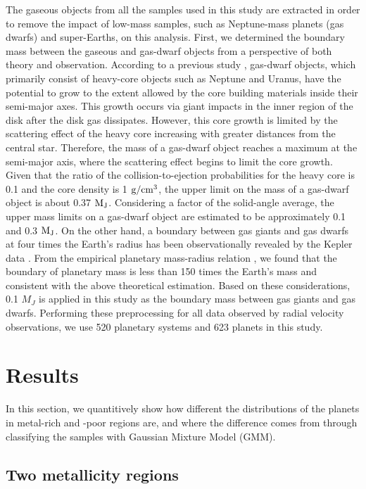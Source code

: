 \documentclass[twocolumn, dvipdfmx]{aastex62}
\begin{document}
\begin{CJK*}{UTF8}{min}
The gaseous objects from all the samples used in this study are extracted in order to remove the impact of low-mass samples, such as Neptune-mass planets (gas dwarfs) and super-Earths, on this analysis. First, we determined the boundary mass between the gaseous and gas-dwarf objects from a perspective of both theory and observation. According to a previous study \citep{2004ApJ...604..388I}, gas-dwarf objects, which primarily consist of heavy-core objects such as Neptune and Uranus, have the potential to grow to the extent allowed by the core building materials inside their semi-major axes. This growth occurs via giant impacts in the inner region of the disk after the disk gas dissipates. However, this core growth is limited by the scattering effect of the heavy core increasing with greater distances from the central star. Therefore, the mass of a gas-dwarf object reaches a maximum at the semi-major axis, where the scattering effect begins to limit the core growth. Given that the ratio of the collision-to-ejection probabilities for the heavy core is 0.1 and the core density is 1 $\rm g/cm^3$, the upper limit on the mass of a gas-dwarf object is about 0.37 $\rm M_J$. Considering a factor of the solid-angle average, the upper mass limits on a gas-dwarf object are estimated to be approximately 0.1 and 0.3 $\rm M_J$. On the other hand, a boundary between gas giants and gas dwarfs at four times the Earth's radius has been observationally revealed by the Kepler data \citep{2012Natur.486..375B}. From the empirical planetary mass-radius relation \cite{2013ApJ...768...14W}, we found that the boundary of planetary mass is less than 150 times the Earth's mass and consistent with the above theoretical estimation. Based on these considerations, 0.1 $M_J$ is applied in this study as the boundary mass between gas giants and gas dwarfs. Performing these preprocessing for all data observed by radial velocity observations, we use 520 planetary systems and 623 planets in this study.


\section{Results} \label{sec:results}

In this section, we quantitively show how different the distributions of the planets in metal-rich and -poor regions are, and where the difference comes from  through classifying the samples with Gaussian Mixture Model (GMM).


\subsection{Two metallicity regions} \label{subsec:metal}


\end{CJK*}
\end{document}
